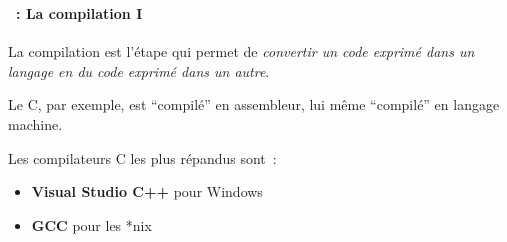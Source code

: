 \begin{frame}
  \frametitle{\secname}
  \framesubtitle{\subsecname~: La compilation I} 
  La compilation est l'étape qui permet de \emph{convertir un code exprimé dans un langage en du code exprimé dans un autre}. 
  \vspace{1cm}
  \par
  Le C, par exemple, est ``compilé'' en assembleur, lui même ``compilé'' en langage machine.
  \vspace{1cm}
  \par
  Les compilateurs C les plus répandus sont~:
  \begin{itemize}
    \item \textbf{Visual Studio C++} pour Windows 
    \item \textbf{GCC} pour les *nix
  \end{itemize}
\end{frame}

